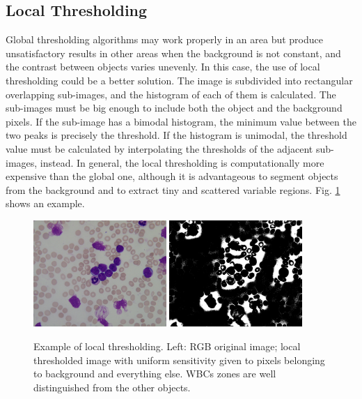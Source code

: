 \documentclass[final,a4paper,12pt,english]{UnicaPhdThesis3}
\begin{document}
\subsection{Local Thresholding} \label{LT} %
Global thresholding algorithms may work properly in an area but produce unsatisfactory results in other areas when the background is not constant, and the contrast between objects varies unevenly. In this case, the use of local thresholding could be a better solution. The image is subdivided into rectangular overlapping sub-images, and the histogram of each of them is calculated. The sub-images must be big enough to include both the object and the background pixels. If the sub-image has a bimodal histogram, the minimum value between the two peaks is precisely the threshold. If the histogram is unimodal, the threshold value must be calculated by interpolating the thresholds of the adjacent sub-images, instead. In general, the local thresholding is computationally more expensive than the global one, although it is advantageous to segment objects from the background and to extract tiny and scattered variable regions. Fig. \ref{fig:localT} shows an example.

\begin{figure}[h]
	\centering
	\includegraphics[width=0.45\textwidth]{images/figcs_rgb}
	\includegraphics[width=0.45\textwidth]{images/fig_localT}
	\caption{\label{fig:localT}Example of local thresholding. Left: RGB original image; local thresholded image with uniform sensitivity given to pixels belonging to background and everything else. WBCs zones are well distinguished from the other objects.}
\end{figure}
\end{document}
